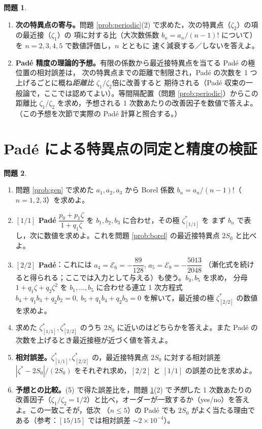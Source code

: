 \documentclass[dvipdfmx, uplatex]{jsarticle}
\newcommand{\cE}{\mathcal{E}}
\theoremstyle{definition}
\newtheorem{prob}{問題}
\begin{document}
\begin{prob}\label{prob:rate}
\begin{enumerate}
\item \textbf{次の特異点の寄与。}問題 \ref{prob:periodic}(2) で求めた，次の特異点（$\zeta_2$）の項の最近接（$\zeta_1$）の
項に対する比（大次数係数 $b_n=a_n/(n-1)!$ について）を $n=2,3,4,5$ で数値評価し，$n$ とともに
速く減衰する／しないを答えよ。
\item \textbf{Pad\'e 精度の理論的予想。}有限の係数から最近接特異点を当てる Pad\'e の極位置の相対誤差は，
次の特異点までの距離で制限され，Pad\'e の次数を 1 つ上げるごとに概ね\emph{距離比 $\zeta_1/\zeta_2$}倍に改善すると
期待される（Pad\'e 収束の一般論で，ここでは認めてよい）。等間隔配置（問題 \ref{prob:periodic}）からこの距離比
$\zeta_1/\zeta_2$ を求め，予想される 1 次数あたりの改善因子を数値で答えよ。
（この予想を次節で実際の Pad\'e 計算と照合する。）
\end{enumerate}
\end{prob}

\section{Pad\'e による特異点の同定と精度の検証}

\begin{prob}\label{prob:pade}
\begin{enumerate}
\item 問題 \ref{prob:gen} で求めた $a_1,a_2,a_3$ から Borel 係数 $b_n=a_n/(n-1)!$（$n=1,2,3$）を求めよ。
\item \textbf{$[1/1]$ Pad\'e} $\dfrac{p_0+p_1\zeta}{1+q_1\zeta}$ を $b_1,b_2,b_3$ に合わせ，その極 $\zeta^\ast_{[1/1]}$ を
まず $b_n$ で表し，次に数値を求めよ。これを問題 \ref{prob:borel} の最近接特異点 $2S_0$ と比べよ。
\item \textbf{$[2/2]$ Pad\'e}：これには $a_4=\cE_6=-\dfrac{89}{128}$, $a_5=\cE_8=-\dfrac{5013}{2048}$
（漸化式を続けると得られる；ここでは入力として与える）も使う。$b_4,b_5$ を求め，
分母 $1+q_1\zeta+q_2\zeta^2$ を $b_1,\dots,b_5$ に合わせる連立 1 次方程式
$b_4+q_1b_3+q_2b_2=0,\ b_5+q_1b_4+q_2b_3=0$ を解いて，最近接の極 $\zeta^\ast_{[2/2]}$ の数値を求めよ。
\item 求めた $\zeta^\ast_{[1/1]},\zeta^\ast_{[2/2]}$ のうち $2S_0$ に近いのはどちらかを答えよ。また Pad\'e の
次数を上げるとき最近接極が近づく値を答えよ。
\item \textbf{相対誤差。}$\zeta^\ast_{[1/1]},\zeta^\ast_{[2/2]}$ の，最近接特異点 $2S_0$ に対する相対誤差
$|\zeta^\ast-2S_0|/(2S_0)$ をそれぞれ求め，$[2/2]$ と $[1/1]$ の誤差の比を求めよ。
\item \textbf{予想との比較。}(5) で得た誤差比を，問題 \ref{prob:rate}(2) で\emph{予想}した 1 次数あたりの
改善因子（$\zeta_1/\zeta_2=1/2$）と比べ，オーダーが一致するか（yes/no）を答えよ。この一致こそが，低次
（$n\le5$）の Pad\'e でも $2S_0$ がよく当たる理由である（参考：$[15/15]$ では相対誤差 $\sim2\times10^{-4}$）。
\end{enumerate}
\end{prob}
\end{document}

